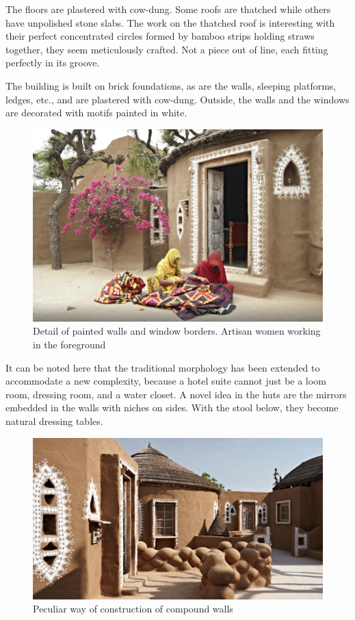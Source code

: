 
The floors are plastered with cow-dung. Some roofs are thatched while others have unpolished stone slabs. The work on the thatched roof is interesting with their perfect concentrated circles formed by bamboo strips holding straws together, they seem meticulously crafted. Not a piece out of line, each fitting perfectly in its groove.

The building is built on brick foundations, as are the walls, sleeping platforms, ledges, etc., and are plastered with cow-dung. Outside, the walls and the windows are decorated with motifs painted in white.

\begin{figure}[H]
  \centering
  \includegraphics[angle=0,width=1.0\textwidth]{img/dc-05}
  \caption{Detail of painted walls and window borders. Artisan women working in the foreground}
  \label{fig:dc-05} 
\end{figure}

\noindent It can be noted here that the traditional morphology has been extended to accommodate a new complexity, because a hotel suite cannot just be a loom room, dressing room, and a water closet. A novel idea in the huts are the mirrors embedded in the walls with niches on sides. With the stool below, they become natural dressing tables.

\begin{figure}[H]
  \centering
  \includegraphics[angle=0,width=1.0\textwidth]{img/dc-06}
  \caption{Peculiar way of construction of compound walls}
  \label{fig:dc-06} 
\end{figure}

